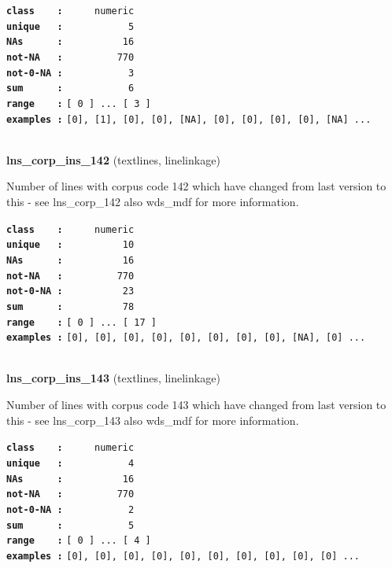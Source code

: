 \documentclass[]{article}
\begin{document}
\textbf{\texttt{class\ \ \ \ :}} \texttt{~~~~~numeric}\\
\textbf{\texttt{unique\ \ \ :}} \texttt{~~~~~~~~~~~5}\\
\textbf{\texttt{NAs\ \ \ \ \ \ :}} \texttt{~~~~~~~~~~16}\\
\textbf{\texttt{not-NA\ \ \ :}} \texttt{~~~~~~~~~770}\\
\textbf{\texttt{not-0-NA\ :}} \texttt{~~~~~~~~~~~3}\\
\textbf{\texttt{sum\ \ \ \ \ \ :}} \texttt{~~~~~~~~~~~6}\\
\textbf{\texttt{range\ \ \ \ :}}
\texttt{{[}\ 0\ {]}\ ...\ {[}\ 3\ {]}}\\
\textbf{\texttt{examples\ :}}
\texttt{{[}0{]},\ {[}1{]},\ {[}0{]},\ {[}0{]},\ {[}NA{]},\ {[}0{]},\ {[}0{]},\ {[}0{]},\ {[}0{]},\ {[}NA{]}\ ...}\\

~

\textbf{lns\_corp\_ins\_142} (textlines, linelinkage)

Number of lines with corpus code 142 which have changed from last
version to this - see lns\_corp\_142 also wds\_mdf for more information.

\textbf{\texttt{class\ \ \ \ :}} \texttt{~~~~~numeric}\\
\textbf{\texttt{unique\ \ \ :}} \texttt{~~~~~~~~~~10}\\
\textbf{\texttt{NAs\ \ \ \ \ \ :}} \texttt{~~~~~~~~~~16}\\
\textbf{\texttt{not-NA\ \ \ :}} \texttt{~~~~~~~~~770}\\
\textbf{\texttt{not-0-NA\ :}} \texttt{~~~~~~~~~~23}\\
\textbf{\texttt{sum\ \ \ \ \ \ :}} \texttt{~~~~~~~~~~78}\\
\textbf{\texttt{range\ \ \ \ :}}
\texttt{{[}\ 0\ {]}\ ...\ {[}\ 17\ {]}}\\
\textbf{\texttt{examples\ :}}
\texttt{{[}0{]},\ {[}0{]},\ {[}0{]},\ {[}0{]},\ {[}0{]},\ {[}0{]},\ {[}0{]},\ {[}0{]},\ {[}NA{]},\ {[}0{]}\ ...}\\

~

\textbf{lns\_corp\_ins\_143} (textlines, linelinkage)

Number of lines with corpus code 143 which have changed from last
version to this - see lns\_corp\_143 also wds\_mdf for more information.

\textbf{\texttt{class\ \ \ \ :}} \texttt{~~~~~numeric}\\
\textbf{\texttt{unique\ \ \ :}} \texttt{~~~~~~~~~~~4}\\
\textbf{\texttt{NAs\ \ \ \ \ \ :}} \texttt{~~~~~~~~~~16}\\
\textbf{\texttt{not-NA\ \ \ :}} \texttt{~~~~~~~~~770}\\
\textbf{\texttt{not-0-NA\ :}} \texttt{~~~~~~~~~~~2}\\
\textbf{\texttt{sum\ \ \ \ \ \ :}} \texttt{~~~~~~~~~~~5}\\
\textbf{\texttt{range\ \ \ \ :}}
\texttt{{[}\ 0\ {]}\ ...\ {[}\ 4\ {]}}\\
\textbf{\texttt{examples\ :}}
\texttt{{[}0{]},\ {[}0{]},\ {[}0{]},\ {[}0{]},\ {[}0{]},\ {[}0{]},\ {[}0{]},\ {[}0{]},\ {[}0{]},\ {[}0{]}\ ...}\\
\end{document}
